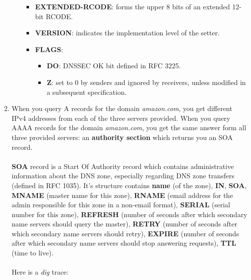 \documentclass[a4paper]{article}
\begin{document}
\begin{enumerate}[label=(\alph*)]
\begin{itemize}
\begin{itemize}
            \item \textbf{EXTENDED-RCODE}: forms the upper 8 bits of an extended 12-bit RCODE.
            \item \textbf{VERSION}: indicates the implementation level of the setter.
            \item \textbf{FLAGS}:
            \begin{itemize}
                \item \textbf{DO}: DNSSEC OK bit defined in RFC 3225.
                \item \textbf{Z}: set to 0 by senders and ignored by receivers, unless modified in a subsequent specification.
            \end{itemize}
        \end{itemize}
    \end{itemize}
    \item When you query A records for the domain \textit{amazon.com}, you get different IPv4 addresses from each of the three servers provided. When you query AAAA records for the domain \textit{amazon.com}, you get the same answer form all three provided servers: an \textbf{authority section} which returns you an SOA record.\\ \\
    \textbf{SOA} record is a Start Of Authority record which contains administrative information about the DNS zone, especially regarding DNS zone transfers (defined in RFC 1035). It's structure contains \textbf{name} (of the zone), \textbf{IN}, \textbf{SOA}, \textbf{MNAME} (master name for this zone), \textbf{RNAME} (email address for the admin responsible for this zone in a non-email format), \textbf{SERIAL} (serial number for this zone), \textbf{REFRESH} (number of seconds after which secondary name servers should query the master), \textbf{RETRY} (number of seconds after which secondary name servers should retry), \textbf{EXPIRE} (number of seconds after which secondary name servers should stop answering requests), \textbf{TTL} (time to live).\\ \\
    Here is a \textit{dig} trace:
\end{enumerate}
\end{document}
